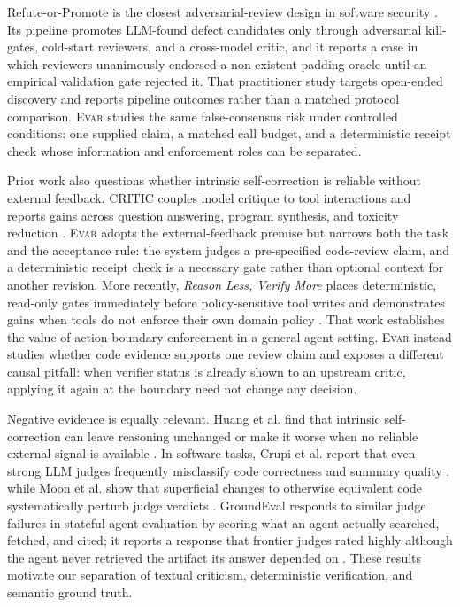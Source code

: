 \documentclass[acmsmall,screen,review,anonymous]{acmart}
\newcommand{\evar}{\textsc{Evar}\xspace}
\begin{document}
Refute-or-Promote is the closest adversarial-review design in software security \cite{refute-promote}. Its pipeline promotes LLM-found defect candidates only through adversarial kill-gates, cold-start reviewers, and a cross-model critic, and it reports a case in which reviewers unanimously endorsed a non-existent padding oracle until an empirical validation gate rejected it. That practitioner study targets open-ended discovery and reports pipeline outcomes rather than a matched protocol comparison. \evar studies the same false-consensus risk under controlled conditions: one supplied claim, a matched call budget, and a deterministic receipt check whose information and enforcement roles can be separated.

Prior work also questions whether intrinsic self-correction is reliable without external feedback. CRITIC couples model critique to tool interactions and reports gains across question answering, program synthesis, and toxicity reduction \cite{critic}. \evar adopts the external-feedback premise but narrows both the task and the acceptance rule: the system judges a pre-specified code-review claim, and a deterministic receipt check is a necessary gate rather than optional context for another revision. More recently, \emph{Reason Less, Verify More} places deterministic, read-only gates immediately before policy-sensitive tool writes and demonstrates gains when tools do not enforce their own domain policy \cite{reason-less}. That work establishes the value of action-boundary enforcement in a general agent setting. \evar instead studies whether code evidence supports one review claim and exposes a different causal pitfall: when verifier status is already shown to an upstream critic, applying it again at the boundary need not change any decision.

Negative evidence is equally relevant. Huang et al. find that intrinsic self-correction can leave reasoning unchanged or make it worse when no reliable external signal is available \cite{huang-self-correct}. In software tasks, Crupi et al. report that even strong LLM judges frequently misclassify code correctness and summary quality \cite{crupi-judge}, while Moon et al. show that superficial changes to otherwise equivalent code systematically perturb judge verdicts \cite{moon-code-judge}. GroundEval responds to similar judge failures in stateful agent evaluation by scoring what an agent actually searched, fetched, and cited; it reports a response that frontier judges rated highly although the agent never retrieved the artifact its answer depended on \cite{groundeval}. These results motivate our separation of textual criticism, deterministic verification, and semantic ground truth.
\end{document}
